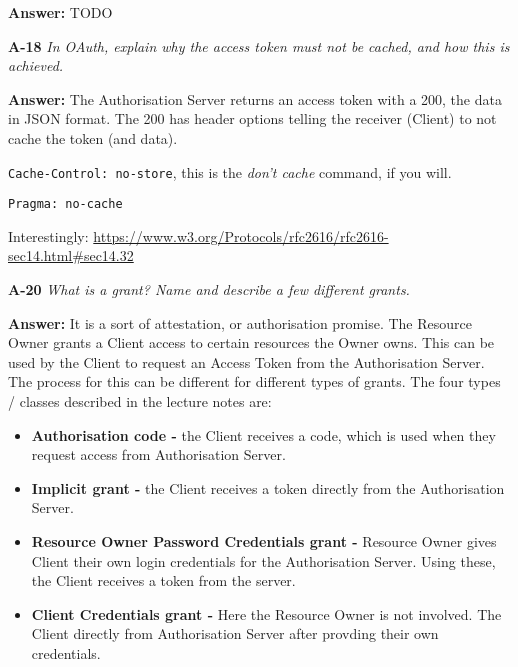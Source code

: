 \documentclass[a4paper]{article}
\newcommand{\Q}[2]{ \vspace{10pt} \textbf{A-#1} \textit{#2} }
\newcommand{\A}[1]{ \textbf{Answer:} #1 }
\begin{document}
\A{
    TODO
}

\Q{18} { %
    In OAuth, explain why the access token must not be cached, and how this is 
    achieved.
}

\A{
    The Authorisation Server returns an access token with a 200,
    the data in JSON format. The 200 has header options
    telling the receiver (Client) to not cache the token (and data).

    \texttt{Cache-Control: no-store}, this is the \textit{don't cache}
    command, if you will. 

    \texttt{Pragma: no-cache}

    Interestingly: \url{https://www.w3.org/Protocols/rfc2616/rfc2616-sec14.html#sec14.32}
}

\Q{20} { %
    What is a grant? Name and describe a few different grants.
}

\A{
    It is a sort of attestation, or authorisation promise. 
    The Resource Owner grants a Client access to certain resources
    the Owner owns. This can be used by the Client to request
    an Access Token from the Authorisation Server.
    The process for this can be different for different types
    of grants. The four types / classes described in the lecture notes are:

    \begin{itemize}
        \item \textbf{Authorisation code - }
            the Client receives a code, which is used
            when they request access from Authorisation Server.
        \item \textbf{Implicit grant - }
            the Client receives a token directly from the Authorisation
            Server.
        \item \textbf{Resource Owner Password Credentials grant - }
            Resource Owner gives Client their own login credentials
            for the Authorisation Server. Using these, the Client 
            receives a token from the server.
        \item \textbf{Client Credentials grant - }
            Here the Resource Owner is not involved. The Client
            directly from Authorisation Server after provding
            their own credentials.
    \end{itemize}

}
\end{document}
